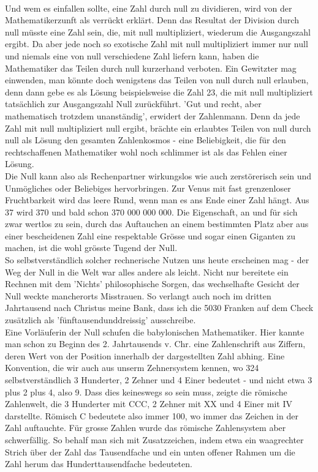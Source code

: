 \documentclass[%
11pt,%
twoside,%
titlepage,%
german,%
headsepline%
]{scrartcl}
\begin{document}
\begin{multicols}{2}
\\
Und wem es einfallen sollte, eine Zahl durch null zu dividieren, wird von der Mathematikerzunft als verrückt erklärt. Denn das Resultat der Division durch null müsste eine Zahl sein, die, mit null multipliziert, wiederum die Ausgangszahl ergibt. Da aber jede noch so exotische Zahl mit null multipliziert immer nur null und niemals eine von null verschiedene Zahl liefern kann, haben die Mathematiker das Teilen durch null kurzerhand verboten. Ein Gewitzter mag einwenden, man könnte doch wenigstens das Teilen von null durch null erlauben, denn dann gebe es als Lösung beispielsweise die Zahl 23, die mit null multipliziert tatsächlich zur Ausgangszahl Null zurückführt. 'Gut und recht, aber mathematisch trotzdem unanständig', erwidert der Zahlenmann. Denn da jede Zahl mit null multipliziert null ergibt, brächte ein erlaubtes Teilen von null durch null als Lösung den gesamten Zahlenkosmos - eine Beliebigkeit, die für den rechtschaffenen Mathematiker wohl noch schlimmer ist als das Fehlen einer Lösung.
\\
Die Null kann also als Rechenpartner wirkungslos wie auch zerstörerisch sein und Unmögliches oder Beliebiges hervorbringen. Zur Venus mit fast grenzenloser Fruchtbarkeit wird das leere Rund, wenn man es ans Ende einer Zahl hängt. Aus 37 wird 370 und bald schon 370 000 000 000. Die Eigenschaft, an und für sich zwar wertlos zu sein, durch das Auftauchen an einem bestimmten Platz aber aus einer bescheidenen Zahl eine respektable Grösse und sogar einen Giganten zu machen, ist die wohl grösste Tugend der Null.
\\
So selbstverständlich solcher rechnerische Nutzen uns heute erscheinen mag - der Weg der Null in die Welt war alles andere als leicht. Nicht nur bereitete ein Rechnen mit dem 'Nichts' philosophische Sorgen, das wechselhafte Gesicht der Null weckte mancherorts Misstrauen. So verlangt auch noch im dritten Jahrtausend nach Christus meine Bank, dass ich die 5030 Franken auf dem Check zusätzlich als 'fünftausendunddreissig' ausschreibe.
\\[5mm]
Eine Vorläuferin der Null schufen die babylonischen Mathematiker. Hier kannte man schon zu Beginn des 2. Jahrtausends v. Chr. eine Zahlenschrift aus Ziffern, deren Wert von der Position innerhalb der dargestellten Zahl abhing. Eine Konvention, die wir auch aus unserm Zehnersystem kennen, wo 324 selbstverständlich 3 Hunderter, 2 Zehner und 4 Einer bedeutet - und nicht etwa 3 plus 2 plus 4, also 9. Dass dies keineswegs so sein muss, zeigte die römische Zahlenwelt, die 3 Hunderter mit CCC, 2 Zehner mit XX und 4 Einer mit IV darstellte. Römisch C bedeutete also immer 100, wo immer das Zeichen in der Zahl auftauchte. Für grosse Zahlen wurde das römische Zahlensystem aber schwerfällig. So behalf man sich mit Zusatzzeichen, indem etwa ein waagrechter Strich über der Zahl das Tausendfache und ein unten offener Rahmen um die Zahl herum das Hunderttausendfache bedeuteten.

\end{multicols}
\end{document}
